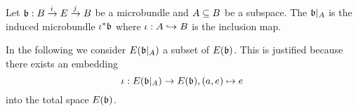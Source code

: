 \begin{myparagraph}
    
\end{myparagraph}

\begin{myexample}    
    Let $\bb: \bundle{B}{E}{i}{j}$ be a microbundle and $A \sub B$ be a subspace.
    The  $\bb\restr{A}$ is the induced microbundle $\iota^*\bb$ where $\iota: A \incl B$ is the inclusion map.
\end{myexample}

\begin{remark}
    In the following we consider $E(\bb\restr{A})$ a subset of $E(\bb)$.
    This is justified because there exists an embedding
    \[ \iota: E(\bb\restr{A}) \to E(\bb), (a, e) \mapsto e \]
    into the total space $E(\bb)$.
\end{remark}